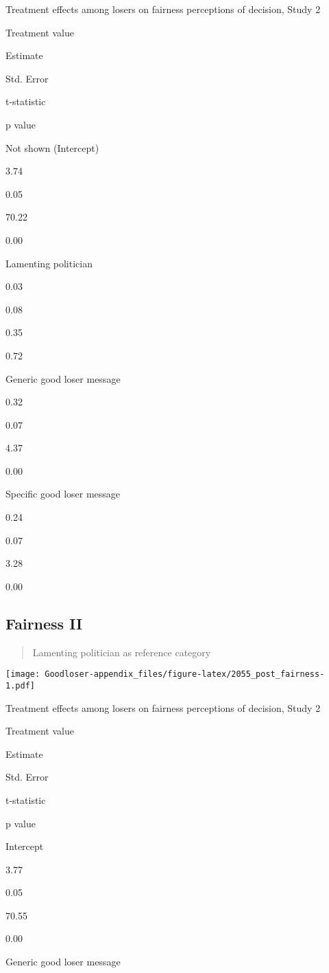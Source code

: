 \documentclass[
]{book}
\begin{document}
Treatment effects among losers on fairness perceptions of decision,
Study 2

Treatment value

Estimate

Std. Error

t-statistic

p value

Not shown (Intercept)

3.74

0.05

70.22

0.00

Lamenting politician

0.03

0.08

0.35

0.72

Generic good loser message

0.32

0.07

4.37

0.00

Specific good loser message

0.24

0.07

3.28

0.00

\hypertarget{fairness-ii-1}{%
\subsection{Fairness II}\label{fairness-ii-1}}

\begin{quote}
Lamenting politician as reference category
\end{quote}

\texttt{[image: Goodloser-appendix\_files/figure-latex/2055\_post\_fairness-1.pdf]}

Treatment effects among losers on fairness perceptions of decision,
Study 2

Treatment value

Estimate

Std. Error

t-statistic

p value

Intercept

3.77

0.05

70.55

0.00

Generic good loser message
\end{document}
